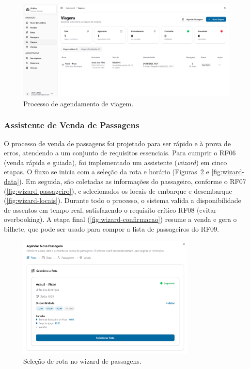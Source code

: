 \begin{figure}[H]
  \centering
  \includegraphics[width=1\textwidth]{imagens/agendamento-viagem.png}
  \caption{Processo de agendamento de viagem.}
  \label{fig:agendamento-viagem}
\end{figure}

\subsubsection{Assistente de Venda de Passagens}
O processo de venda de passagens foi projetado para ser rápido e à prova de erros, atendendo a um conjunto de requisitos essenciais. Para cumprir o RF06 (venda rápida e guiada), foi implementado um assistente (\textit{wizard}) em cinco etapas. O fluxo se inicia com a seleção da rota e horário (Figuras~\ref{fig:wizard-rota} e \ref{fig:wizard-data}). Em seguida, são coletadas as informações do passageiro, conforme o RF07 (\autoref{fig:wizard-passageiro}), e selecionados os locais de embarque e desembarque (\autoref{fig:wizard-locais}). Durante todo o processo, o sistema valida a disponibilidade de assentos em tempo real, satisfazendo o requisito crítico RF08 (evitar overbooking). A etapa final (\autoref{fig:wizard-confirmacao}) resume a venda e gera o bilhete, que pode ser usado para compor a lista de passageiros do RF09.

\begin{figure}[H]
  \centering
  \includegraphics[width=0.8\textwidth]{imagens/wizard-rota.png}
  \caption{Seleção de rota no wizard de passagens.}
  \label{fig:wizard-rota}
\end{figure}

